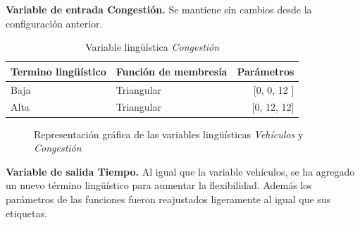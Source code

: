 \textbf{Variable de entrada Congestión.} Se mantiene sin cambios desde la configuración anterior.


\begin{table}[!h]
	\centering
	\begin{tabular}{llr} \toprule
		Termino lingüístico & Función de membresía & Parámetros \\ \midrule
		Baja & Triangular & [0, 0, 12 ] \\
		Alta & Triangular & [0, 12, 12] \\ \bottomrule
	\end{tabular}
	\caption[Variable lingüística \textit{Congestión} (configuración \textit{C})]{Variable lingüística \textit{Congestión}}
\end{table}

\begin{figure}[H]
	\centering
	\caption[Representación gráfica de las variables lingüísticas \textit{Vehículos} y \textit{Congestión} (configuración \textit{C})]{Representación gráfica de las variables lingüísticas \textit{Vehículos} y \textit{Congestión}}
\end{figure}

\pagebreak
\textbf{Variable de salida Tiempo.} Al igual que la variable vehículos, se ha agregado un nuevo término lingüístico para aumentar la flexibilidad. Además los parámetros de las funciones fueron reajustados ligeramente al igual que sus etiquetas.

